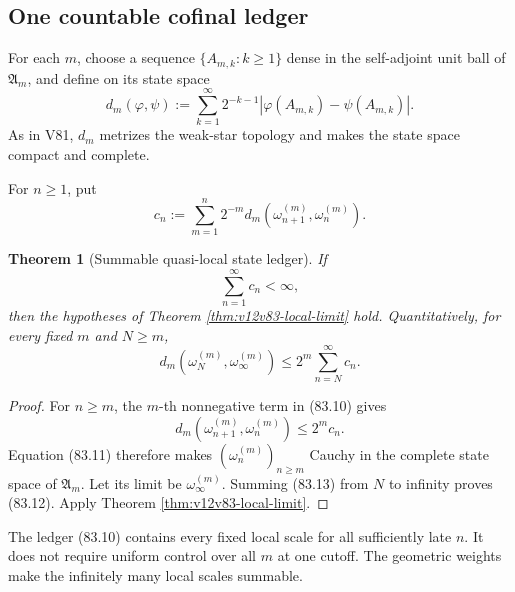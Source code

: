 \documentclass[11pt]{article}
\newtheorem{theorem}{Theorem}[section]
\theoremstyle{remark}
\begin{document}
\subsection{One countable cofinal ledger}

For each \(m\), choose a sequence
\(\{A_{m,k}:k\geq1\}\) dense in the self-adjoint unit ball of
\({\mathfrak A}_m\), and define on its state space
\begin{equation}
 d_m(\varphi,\psi)
 :=
 \sum_{k=1}^{\infty}2^{-k-1}
 |\varphi(A_{m,k})-\psi(A_{m,k})|.                           \tag{83.9}
\end{equation}
As in V81, \(d_m\) metrizes the weak-star topology and makes the
state space compact and complete.

For \(n\geq1\), put
\begin{equation}
 c_n:=
 \sum_{m=1}^{n}2^{-m}
 d_m(\omega_{n+1}^{(m)},\omega_n^{(m)}).                    \tag{83.10}
\end{equation}

\begin{theorem}[Summable quasi-local state ledger]
\label{thm:v12v83-ledger}
If
\begin{equation}
                              \sum_{n=1}^{\infty}c_n<\infty, \tag{83.11}
\end{equation}
then the hypotheses of Theorem
\ref{thm:v12v83-local-limit} hold.  Quantitatively, for every fixed
\(m\) and \(N\geq m\),
\begin{equation}
 d_m(\omega_N^{(m)},\omega_\infty^{(m)})
 \leq 2^m\sum_{n=N}^{\infty}c_n.                            \tag{83.12}
\end{equation}
\end{theorem}

\begin{proof}
For \(n\geq m\), the \(m\)-th nonnegative term in (83.10) gives
\[
 d_m(\omega_{n+1}^{(m)},\omega_n^{(m)})
 \leq2^mc_n.                                                 \tag{83.13}
\]
Equation (83.11) therefore makes
\((\omega_n^{(m)})_{n\geq m}\) Cauchy in the complete state space of
\({\mathfrak A}_m\).  Let its limit be
\(\omega_\infty^{(m)}\).  Summing (83.13) from \(N\) to infinity
proves (83.12).  Apply Theorem
\ref{thm:v12v83-local-limit}.
\end{proof}

The ledger (83.10) contains every fixed local scale for all
sufficiently late \(n\).  It does not require uniform control over
all \(m\) at one cutoff.  The geometric weights make the infinitely
many local scales summable.
\end{document}
